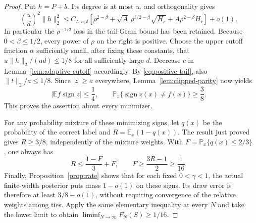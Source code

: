 \begin{proof}
Put $h=P+b$. Its degree is at most $u$, and orthogonality gives
\begin{equation}\label{eq:positive-correlation-scale}
 \left(\frac ud\right)^2\|h\|_2^2
 \le C_{L,a,\delta}\left[
 \rho^{2-\beta}
 +\sqrt A\,\rho^{3/2-\beta}\sqrt{H_r}
 +A\rho^{2-\beta}H_r\right]+o(1).
\end{equation}
In particular the $\rho^{-1/2}$ loss in the tail-Gram bound has been
retained. Because $0<\beta\le1/2$, every power of $\rho$ on the
right is positive. Choose the upper cutoff fraction $\alpha$ sufficiently
small, after fixing these constants, that
$u\|h\|_2/(ad)\le1/8$ for all sufficiently large $d$.
Decrease $c$ in Lemma~\ref{lem:adaptive-cutoff} accordingly.
By \eqref{eq:positive-tail}, also $\|t\|_2/a\le1/8$.
Since $|z|\ge a$ everywhere, Lemma~\ref{lem:clipped-parity} now yields
\[
 |\mathbb E f\operatorname{sign}z|\le\frac14,
 \qquad
 \mathbb P_x\{\operatorname{sign}z(x)\ne f(x)\}\ge\frac38.
\]
This proves the assertion about every minimizer.

For any probability mixture of these minimizing signs, let $q(x)$
be the probability of the correct label and $R=\mathbb E_x(1-q(x))$.
The result just proved gives $R\ge3/8$, independently of the mixture
weights. With $F=\mathbb P_x\{q(x)\le2/3\}$, one always has
\[
 R\le\frac{1-F}{3}+F,
 \qquad F\ge\frac{3R-1}{2}\ge\frac1{16}.
\]
Finally, Proposition~\ref{prop:rate} shows that for each fixed
$0<\gamma<1$, the actual finite-width posterior puts mass $1-o(1)$
on these signs. Its draw error is therefore at least $3/8-o(1)$,
without requiring convergence of the relative weights among ties.
Apply the same elementary inequality at every $N$ and take the
lower limit to obtain $\liminf_{N\to\infty}F_N(S)\ge1/16$.
\end{proof}
